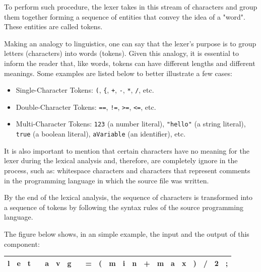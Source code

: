 To perform such procedure, the lexer takes in this stream of characters and group them together forming a sequence of entities that convey the idea of a "word". These entities are called tokens.

Making an analogy to linguistics, one can say that the lexer's purpose is to group letters (characters) into words (tokens). Given this analogy, it is essential to inform the reader that, like words, tokens can have different lengths and different meanings. Some examples are listed below to better illustrate a few cases:
\begin{itemize}
    \item Single-Character Tokens: \texttt{(}, \texttt{\{}, \texttt{+}, \texttt{-}, \texttt{*}, \texttt{/}, etc.
    \item Double-Character Tokens: \texttt{==}, \texttt{!=}, \texttt{>=}, \texttt{<=}, etc.
    \item Multi-Character Tokens: \texttt{123} (a number literal), \texttt{"hello"} (a string literal), \texttt{true} (a boolean literal), \texttt{aVariable} (an identifier), etc.
\end{itemize}

It is also important to mention that certain characters have no meaning for the lexer during the lexical analysis and, therefore, are completely ignore in the process, such as: whitespace characters and characters that represent comments in the programming language in which the source file was written.

By the end of the lexical analysis, the sequence of characters is transformed into a sequence of tokens by following the syntax rules of the source programming language.

The figure below shows, in an simple example, the input and the output of this component:

\begin{table}[H]
    \centering
    \begin{tabular}{|c|c|c|c|c|c|c|c|c|c|c|c|c|c|c|c|c|c|c|c|c|}
        \hline
        l & e & t &  & a & v & g &  & = & ( & m & i & n & + & m & a & x & ) & / & 2 & ; \\
        \hline
    \end{tabular}
\end{table}

